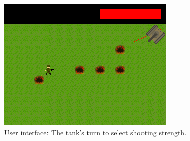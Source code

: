 \begin{figure}[ht]
\centering
\includegraphics[scale=0.6]{screenshots/16730.png}
\caption{User interface: The tank's turn to select shooting strength.}
\label{fig:gamescr3}
\end{figure}
